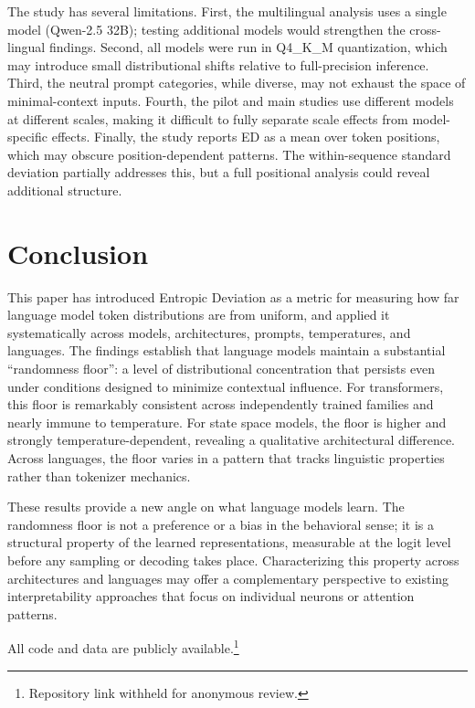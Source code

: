 \documentclass{article}
\begin{document}
The study has several limitations. First, the multilingual analysis uses a single model (Qwen-2.5 32B); testing additional models would strengthen the cross-lingual findings. Second, all models were run in Q4\_K\_M quantization, which may introduce small distributional shifts relative to full-precision inference. Third, the neutral prompt categories, while diverse, may not exhaust the space of minimal-context inputs. Fourth, the pilot and main studies use different models at different scales, making it difficult to fully separate scale effects from model-specific effects. Finally, the study reports ED as a mean over token positions, which may obscure position-dependent patterns. The within-sequence standard deviation partially addresses this, but a full positional analysis could reveal additional structure.

\section{Conclusion}
\label{sec:conclusion}

This paper has introduced Entropic Deviation as a metric for measuring how far language model token distributions are from uniform, and applied it systematically across models, architectures, prompts, temperatures, and languages. The findings establish that language models maintain a substantial ``randomness floor'': a level of distributional concentration that persists even under conditions designed to minimize contextual influence. For transformers, this floor is remarkably consistent across independently trained families and nearly immune to temperature. For state space models, the floor is higher and strongly temperature-dependent, revealing a qualitative architectural difference. Across languages, the floor varies in a pattern that tracks linguistic properties rather than tokenizer mechanics.

These results provide a new angle on what language models learn. The randomness floor is not a preference or a bias in the behavioral sense; it is a structural property of the learned representations, measurable at the logit level before any sampling or decoding takes place. Characterizing this property across architectures and languages may offer a complementary perspective to existing interpretability approaches that focus on individual neurons or attention patterns.

All code and data are publicly available.\footnote{Repository link withheld for anonymous review.}
\end{document}
